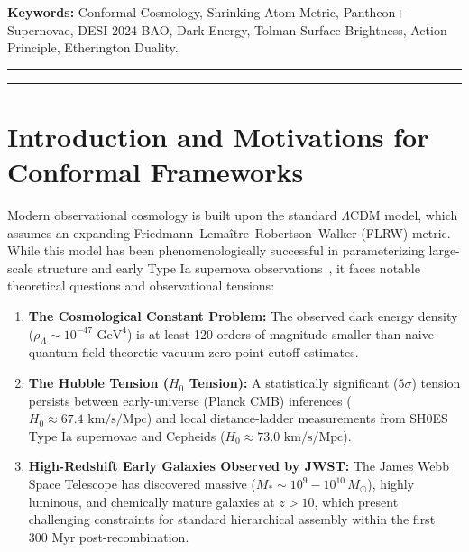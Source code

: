 \documentclass[11pt,a4paper]{article}
\begin{document}
\vspace{1em}
\noindent\textbf{Keywords:} Conformal Cosmology, Shrinking Atom Metric, Pantheon+ Supernovae, DESI 2024 BAO, Dark Energy, Tolman Surface Brightness, Action Principle, Etherington Duality.

\vspace{1em}
\hrule
\vspace{0.8em}
\tableofcontents
\vspace{0.8em}
\hrule
\vspace{1.5em}

\section{Introduction and Motivations for Conformal Frameworks}
\label{sec:intro_cosmo}

Modern observational cosmology is built upon the standard $\Lambda\mathrm{CDM}$ model, which assumes an expanding Friedmann--Lema\^itre--Robertson--Walker (FLRW) metric. While this model has been phenomenologically successful in parameterizing large-scale structure and early Type Ia supernova observations~\cite{riess1998,perlmutter1999}, it faces notable theoretical questions and observational tensions:
\begin{enumerate}
    \item \textbf{The Cosmological Constant Problem:} The observed dark energy density ($\rho_\Lambda \sim 10^{-47}\text{ GeV}^4$) is at least 120 orders of magnitude smaller than naive quantum field theoretic vacuum zero-point cutoff estimates.
    \item \textbf{The Hubble Tension ($H_0$ Tension):} A statistically significant ($5\sigma$) tension persists between early-universe (Planck CMB) inferences ($H_0 \approx 67.4\text{ km/s/Mpc}$) and local distance-ladder measurements from SH0ES Type Ia supernovae and Cepheids ($H_0 \approx 73.0\text{ km/s/Mpc}$).
    \item \textbf{High-Redshift Early Galaxies Observed by JWST:} The James Webb Space Telescope has discovered massive ($M_* \sim 10^9 - 10^{10}\,M_\odot$), highly luminous, and chemically mature galaxies at $z > 10$, which present challenging constraints for standard hierarchical assembly within the first $300\text{ Myr}$ post-recombination.
\end{enumerate}
\end{document}
